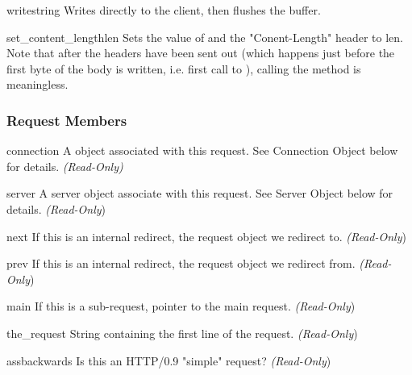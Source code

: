 \begin{methoddesc}[request]{write}{string}
Writes  directly to the client, then flushes the buffer. 
\end{methoddesc}

\begin{methoddesc}[request]{set_content_length}{len}
Sets the value of  and the "Conent-Length" header
to len. Note that after the headers have been sent out (which happens
just before the first byte of the body is written, i.e. first call to
), calling the method is meaningless.
\end{methoddesc}

\subsubsection{Request Members\label{pyapi-mprequest-mem}}

\begin{memberdesc}[request]{connection}
A  object associated with this request. See
Connection Object below for details.
\emph{(Read-Only)}
\end{memberdesc}

\begin{memberdesc}[request]{server}
A server object associate with this request. See Server Object below
for details.
\emph{(Read-Only})
\end{memberdesc}

\begin{memberdesc}[request]{next}
If this is an internal redirect, the request object we redirect to. 
\emph{(Read-Only})
\end{memberdesc}

\begin{memberdesc}[request]{prev}
If this is an internal redirect, the request object we redirect from.
\emph{(Read-Only})
\end{memberdesc}

\begin{memberdesc}[request]{main}
If this is a sub-request, pointer to the main request. 
\emph{(Read-Only})
\end{memberdesc}

\begin{memberdesc}[request]{the_request}
String containing the first line of the request.
\emph{(Read-Only})
\end{memberdesc}

\begin{memberdesc}[request]{assbackwards}
Is this an HTTP/0.9 "simple" request? 
\emph{(Read-Only})
\end{memberdesc}

